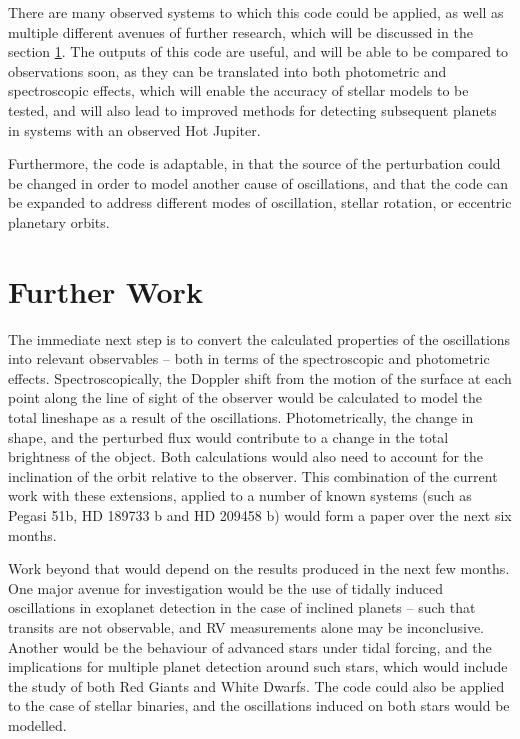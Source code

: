 \documentclass[11pt]{amsart}
\begin{document}
There are many observed systems to which this code could be applied, as well as multiple different avenues of further research, which will be discussed in the section \ref{Future}.  The outputs of this code are useful, and will be able to be compared to observations soon, as they can be translated into both photometric and spectroscopic effects, which will enable the accuracy of stellar models to be tested, and will also lead to improved methods for detecting subsequent planets in systems with an observed Hot Jupiter.

Furthermore, the code is adaptable, in that the source of the perturbation could be changed in order to model another cause of oscillations, and that the code can be expanded to address different modes of oscillation, stellar rotation, or eccentric planetary orbits.







\section{Further Work}   \label{Future}

The immediate next step is to convert the calculated properties of the oscillations into relevant observables -- both in terms of the spectroscopic and photometric effects.  Spectroscopically, the Doppler shift from the motion of the surface at each point along the line of sight of the observer would be calculated to model the total lineshape as a result of the oscillations.  Photometrically, the change in shape, and the perturbed flux would contribute to a change in the total brightness of the object.  Both calculations would also need to account for the inclination of the orbit relative to the observer.  This combination of the current work with these extensions, applied to a number of known systems (such as Pegasi 51b, HD 189733 b and HD 209458 b) would form a paper over the next six months.

Work beyond that would depend on the results produced in the next few months.  One major avenue for investigation would be the use of tidally induced oscillations in exoplanet detection in the case of inclined planets -- such that transits are not observable, and RV measurements alone may be inconclusive.  Another would be the behaviour of advanced stars under tidal forcing, and the implications for multiple planet detection around such stars, which would include the study of both Red Giants and White Dwarfs.  The code could also be applied to the case of stellar binaries, and the oscillations induced on both stars would be modelled.  
\end{document}
